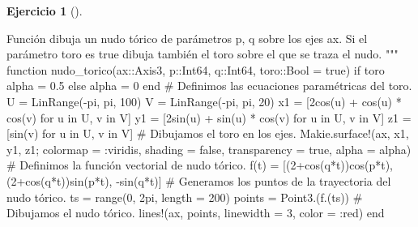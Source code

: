 \documentclass[
  a4paper,
]{scrreport}
\newenvironment{Shaded}{\begin{snugshade}}{\end{snugshade}}
\newcommand{\CommentTok}[1]{\textcolor[rgb]{0.37,0.37,0.37}{#1}}
\newcommand{\ConstantTok}[1]{\textcolor[rgb]{0.56,0.35,0.01}{#1}}
\newcommand{\ControlFlowTok}[1]{\textcolor[rgb]{0.00,0.23,0.31}{#1}}
\newcommand{\DataTypeTok}[1]{\textcolor[rgb]{0.68,0.00,0.00}{#1}}
\newcommand{\FloatTok}[1]{\textcolor[rgb]{0.68,0.00,0.00}{#1}}
\newcommand{\FunctionTok}[1]{\textcolor[rgb]{0.28,0.35,0.67}{#1}}
\newcommand{\KeywordTok}[1]{\textcolor[rgb]{0.00,0.23,0.31}{#1}}
\newcommand{\NormalTok}[1]{\textcolor[rgb]{0.00,0.23,0.31}{#1}}
\newcommand{\OperatorTok}[1]{\textcolor[rgb]{0.37,0.37,0.37}{#1}}
\newcommand{\StringTok}[1]{\textcolor[rgb]{0.13,0.47,0.30}{#1}}
\theoremstyle{definition}
\newtheorem{exercise}{Ejercicio}[chapter]
\theoremstyle{remark}
\begin{document}
\begin{exercise}[]
\begin{enumerate}
\begin{tcolorbox}
\begin{Shaded}
\begin{Highlighting}[]
\StringTok{Función dibuja un nudo tórico de parámetros p, q sobre los ejes ax. Si el parámetro toro es true dibuja también el toro sobre el que se traza el nudo.}
\StringTok{"""}
\KeywordTok{function} \FunctionTok{nudo\_torico}\NormalTok{(ax}\OperatorTok{::}\DataTypeTok{Axis3}\NormalTok{, p}\OperatorTok{::}\DataTypeTok{Int64}\NormalTok{, q}\OperatorTok{::}\DataTypeTok{Int64}\NormalTok{, toro}\OperatorTok{::}\DataTypeTok{Bool }\OperatorTok{=} \ConstantTok{true}\NormalTok{)}
    \ControlFlowTok{if}\NormalTok{ toro }
\NormalTok{        alpha }\OperatorTok{=} \FloatTok{0.5}
    \ControlFlowTok{else}
\NormalTok{        alpha }\OperatorTok{=} \FloatTok{0}
    \ControlFlowTok{end}
    \CommentTok{\# Definimos las ecuaciones paramétricas del toro.}
\NormalTok{    U }\OperatorTok{=} \FunctionTok{LinRange}\NormalTok{(}\OperatorTok{{-}}\ConstantTok{pi}\NormalTok{, }\ConstantTok{pi}\NormalTok{, }\FloatTok{100}\NormalTok{)}
\NormalTok{    V }\OperatorTok{=} \FunctionTok{LinRange}\NormalTok{(}\OperatorTok{{-}}\ConstantTok{pi}\NormalTok{, }\ConstantTok{pi}\NormalTok{, }\FloatTok{20}\NormalTok{)}
\NormalTok{    x1 }\OperatorTok{=}\NormalTok{ [}\FloatTok{2}\FunctionTok{cos}\NormalTok{(u) }\OperatorTok{+} \FunctionTok{cos}\NormalTok{(u) }\OperatorTok{*} \FunctionTok{cos}\NormalTok{(v) for u }\KeywordTok{in}\NormalTok{ U, v }\KeywordTok{in}\NormalTok{ V]}
\NormalTok{    y1 }\OperatorTok{=}\NormalTok{ [}\FloatTok{2}\FunctionTok{sin}\NormalTok{(u) }\OperatorTok{+} \FunctionTok{sin}\NormalTok{(u) }\OperatorTok{*} \FunctionTok{cos}\NormalTok{(v) for u }\KeywordTok{in}\NormalTok{ U, v }\KeywordTok{in}\NormalTok{ V]}
\NormalTok{    z1 }\OperatorTok{=}\NormalTok{ [}\FunctionTok{sin}\NormalTok{(v) for u }\KeywordTok{in}\NormalTok{ U, v }\KeywordTok{in}\NormalTok{ V]}
    \CommentTok{\# Dibujamos el toro en los ejes.}
\NormalTok{    Makie.}\FunctionTok{surface!}\NormalTok{(ax, x1, y1, z1; colormap }\OperatorTok{=} \OperatorTok{:}\NormalTok{viridis, shading }\OperatorTok{=} \ConstantTok{false}\NormalTok{, transparency }\OperatorTok{=} \ConstantTok{true}\NormalTok{, alpha }\OperatorTok{=}\NormalTok{ alpha)}
    \CommentTok{\# Definimos la función vectorial de nudo tórico.}
    \FunctionTok{f}\NormalTok{(t) }\OperatorTok{=}\NormalTok{ [(}\FloatTok{2}\FunctionTok{+cos}\NormalTok{(q}\OperatorTok{*}\NormalTok{t))}\FunctionTok{cos}\NormalTok{(p}\OperatorTok{*}\NormalTok{t), (}\FloatTok{2}\FunctionTok{+cos}\NormalTok{(q}\OperatorTok{*}\NormalTok{t))}\FunctionTok{sin}\NormalTok{(p}\OperatorTok{*}\NormalTok{t), }\FunctionTok{{-}sin}\NormalTok{(q}\OperatorTok{*}\NormalTok{t)] }
    \CommentTok{\# Generamos los puntos de la trayectoria del nudo tórico.}
\NormalTok{    ts }\OperatorTok{=} \FunctionTok{range}\NormalTok{(}\FloatTok{0}\NormalTok{, }\FloatTok{2}\NormalTok{pi, length }\OperatorTok{=} \FloatTok{200}\NormalTok{)}
\NormalTok{    points }\OperatorTok{=} \FunctionTok{Point3}\NormalTok{.(}\FunctionTok{f}\NormalTok{.(ts))}
    \CommentTok{\# Dibujamos el nudo tórico.}
    \FunctionTok{lines!}\NormalTok{(ax, points, linewidth }\OperatorTok{=} \FloatTok{3}\NormalTok{, color }\OperatorTok{=} \OperatorTok{:}\NormalTok{red)}
\KeywordTok{end}


\end{Highlighting}
\end{Shaded}
\end{tcolorbox}
\end{enumerate}
\end{exercise}
\end{document}
